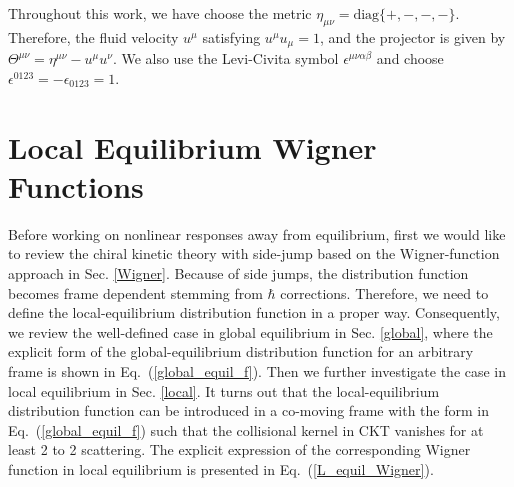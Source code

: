 \documentclass[aps,prd,showkeys,preprint,amsmath,amssymb,nofootinbib]{revtex4-1}
\begin{document}
Throughout this work, we have choose the metric $\eta_{\mu\nu}=\text{diag}\{+,-,-,-\}$. Therefore, the fluid velocity $u^\mu$ satisfying $u^\mu u_\mu =1$, and the projector is given by $\Theta^{\mu\nu}=\eta^{\mu\nu}-u^{\mu}u^{\nu}$. We also use the Levi-Civita symbol $\epsilon^{\mu\nu\alpha\beta}$ and choose
$\epsilon^{0123}=-\epsilon_{0123}=1$. 

\section{ Local Equilibrium Wigner Functions}\label{Local_Equilibrium}
Before working on nonlinear responses away from equilibrium, first we
would like to review the chiral kinetic theory with side-jump based on the 
Wigner-function approach in Sec. \ref{Wigner}. Because of side jumps, the distribution function
becomes frame dependent stemming from $\hbar$ corrections. Therefore, we need to define the local-equilibrium distribution 
function in a proper way. Consequently, we review the well-defined case
in global equilibrium in Sec. \ref{global}, where the explicit form of the global-equilibrium distribution function for an arbitrary frame is shown in Eq.~(\ref{global_equil_f}). Then we further investigate the case in local equilibrium in Sec. \ref{local}. It turns out that the local-equilibrium distribution function can be introduced in a co-moving frame with the form in Eq.~(\ref{global_equil_f}) such that the collisional kernel in CKT vanishes for at least 2 to 2 scattering. The explicit expression of the corresponding Wigner function in local equilibrium is presented in Eq.~(\ref{L_equil_Wigner}).


\end{document}
